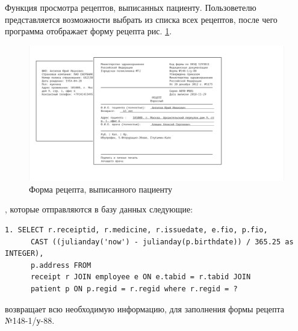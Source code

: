 \documentclass[14pt,a4paper,russian]{extreport}
\begin{document}
Функция просмотра рецептов, выписанных пациенту. Пользоветелю представляется возможности выбрать из списка всех рецептов, после чего программа отображает форму рецепта рис. \ref{fig:receipt-form}.\par
\begin{figure}[h!]
        \includegraphics[width=\textwidth]{prog_int/receipt}
        \caption{Форма рецепта, выписанного пациенту}
        \label{fig:receipt-form}
\end{figure}
, которые отправляются в базу данных следующие: 
\begin{lstlisting}[style=csql] 
1. SELECT r.receiptid, r.medicine, r.issuedate, e.fio, p.fio, 
	  CAST ((julianday('now') - julianday(p.birthdate)) / 365.25 as INTEGER), 
	  p.address FROM 
	  receipt r JOIN employee e ON e.tabid = r.tabid JOIN 
	  patient p ON p.regid = r.regid where r.regid = ?
\end{lstlisting}
 возвращает всю необходимую информацию, для заполнения формы рецепта №148-1/у-88.\par\par
\end{document}
